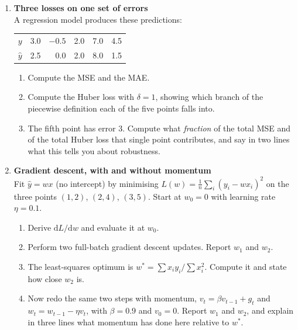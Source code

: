 \documentclass[11pt,a4paper]{article}
\begin{document}
\begin{enumerate}[label=\textbf{B\arabic*.}, leftmargin=*]

  \item \textbf{Three losses on one set of errors} \\
    A regression model produces these predictions:
    \begin{center}\begin{tabular}{@{}lrrrrr@{}}\toprule
    $y$ & 3.0 & $-0.5$ & 2.0 & 7.0 & 4.5\\
    $\hat{y}$ & 2.5 & 0.0 & 2.0 & 8.0 & 1.5\\
    \bottomrule\end{tabular}\end{center}
    \begin{enumerate}[label=(\alph*), leftmargin=*]
      \item Compute the MSE and the MAE. 
      \item Compute the Huber loss with $\delta = 1$, showing which branch of
        the piecewise definition each of the five points falls into. 
      \item The fifth point has error 3. Compute what \emph{fraction} of the
        total MSE and of the total Huber loss that single point contributes,
        and say in two lines what this tells you about robustness. 
    \end{enumerate}

  \item \textbf{Gradient descent, with and without momentum} \\
    Fit $\hat{y} = wx$ (no intercept) by minimising
    $L(w) = \frac{1}{n}\sum_i (y_i - wx_i)^2$ on the three points
    $(1,2)$, $(2,4)$, $(3,5)$. Start at $w_0 = 0$ with learning rate
    $\eta = 0.1$.
    \begin{enumerate}[label=(\alph*), leftmargin=*]
      \item Derive $\mathrm{d}L/\mathrm{d}w$ and evaluate it at $w_0$. 
      \item Perform two full-batch gradient descent updates. Report $w_1$ and $w_2$. 
      \item The least-squares optimum is $w^{*} = \sum x_iy_i / \sum x_i^2$.
        Compute it and state how close $w_2$ is. 
      \item Now redo the same two steps with momentum, $v_t = \beta v_{t-1} + g_t$
        and $w_t = w_{t-1} - \eta v_t$, with $\beta = 0.9$ and $v_0 = 0$.
        Report $w_1$ and $w_2$, and explain in three lines what momentum has
        done here relative to $w^{*}$. 
    \end{enumerate}


\end{enumerate}
\end{document}
